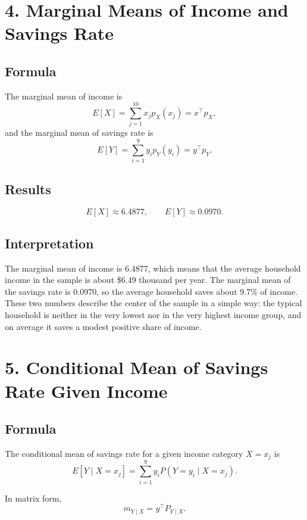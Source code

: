 \documentclass[12pt]{article}
\newcommand{\x}{40pt}
\begin{document}
\vspace{\x}
\section*{4. Marginal Means of Income and Savings Rate}

\subsection*{Formula}

The marginal mean of income is
\[
E[X]=\sum_{j=1}^{10}x_j p_X(x_j)=x^\top p_X,
\]
and the marginal mean of savings rate is
\[
E[Y]=\sum_{i=1}^{9}y_i p_Y(y_i)=y^\top p_Y.
\]

\subsection*{Results}

\[
E[X]\approx 6.4877,
\qquad
E[Y]\approx 0.0970.
\]

\subsection*{Interpretation}

The marginal mean of income is 6.4877, which means that the average household income in the sample is about \$6.49 thousand per year. The marginal mean of the savings rate is 0.0970, so the average household saves about 9.7\% of income. These two numbers describe the center of the sample in a simple way: the typical household is neither in the very lowest nor in the very highest income group, and on average it saves a modest positive share of income.




\vspace{\x}
\section*{5. Conditional Mean of Savings Rate Given Income}

\subsection*{Formula}

The conditional mean of savings rate for a given income category $X=x_j$ is
\[
E[Y\mid X=x_j]=\sum_{i=1}^{9} y_i P(Y=y_i\mid X=x_j).
\]

In matrix form,
\[
m_{Y\mid X}=y^\top P_{Y\mid X}.
\]
\end{document}
